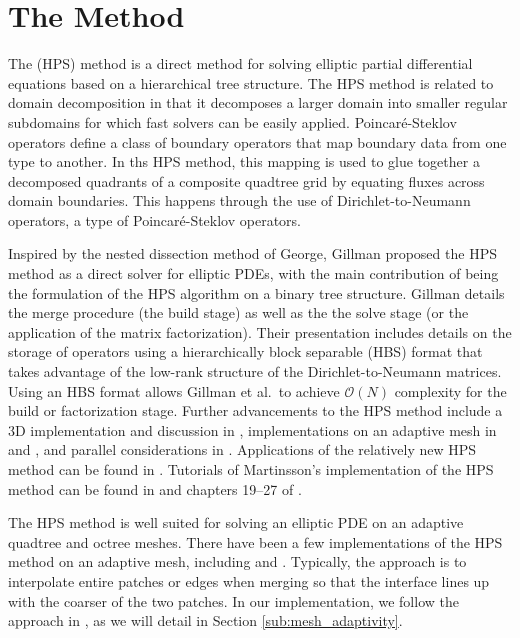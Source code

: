 \section{The \HPS Method}
\label{sec:hps}

The \HPS (HPS) method is a direct method for solving elliptic partial differential equations based on a hierarchical tree structure. The HPS method is related to domain decomposition in that it decomposes a larger domain into smaller regular subdomains for which fast solvers can be easily applied. Poincaré-Steklov operators \citep{quarteroni1991theory} define a class of boundary operators that map boundary data from one type to another. In ths HPS method, this mapping is used to glue together a decomposed quadrants of a composite quadtree grid by equating fluxes across domain boundaries. This happens through the use of Dirichlet-to-Neumann operators, a type of Poincaré-Steklov operators. 

Inspired by the nested dissection method of George, Gillman proposed the HPS method as a direct solver for elliptic PDEs, with the main contribution of \citep{gillman2014direct} being the formulation of the HPS algorithm on a binary tree structure. Gillman details the merge procedure (the build stage) as well as the the solve stage (or the application of the matrix factorization). Their presentation includes details on the storage of operators using a hierarchically block separable (HBS) format that takes advantage of the low-rank structure of the Dirichlet-to-Neumann matrices. Using an HBS format allows Gillman et al.\ to achieve $\mathcal{O}(N)$ complexity for the build or factorization stage. Further advancements to the HPS method include a 3D implementation and discussion in \citep{hao2016direct}, implementations on an adaptive mesh in \citep{babb2018accelerated} and \citep{geldermans2019adaptive}, and parallel considerations in \citep{beams2020parallel}. Applications of the relatively new HPS method can be found in \citep{fortunato2020ultraspherical}. Tutorials of Martinsson's implementation of the HPS method can be found in \citep{martinsson2015hierarchical} and chapters 19--27 of \citep{martinsson2019fast}.

The HPS method is well suited for solving an elliptic PDE on an adaptive quadtree and octree meshes. There have been a few implementations of the HPS method on an adaptive mesh, including \citep{babb2018accelerated} and \citep{geldermans2019adaptive}. Typically, the approach is to interpolate entire patches or edges when merging so that the interface lines up with the coarser of the two patches. In our implementation, we follow the approach in \citep{babb2018accelerated}, as we will detail in Section \ref{sub:mesh_adaptivity}.

